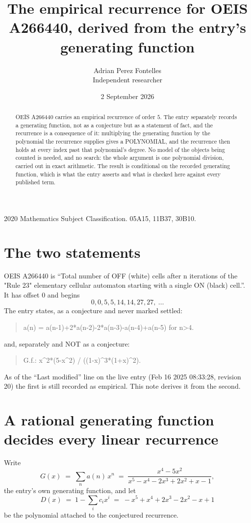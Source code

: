 \documentclass[11pt,a4paper]{article}
\title{The empirical recurrence for OEIS A266440, derived from the entry's generating function}
\author{Adrian Perez Fontelles\\ \small Independent researcher}
\date{2 September 2026}
\theoremstyle{plain}
\theoremstyle{definition}
\begin{document}
\maketitle

\begin{abstract}
OEIS A266440 carries an empirical recurrence of order $5$. The entry separately records a
generating function, not as a conjecture but as a statement of fact, and the recurrence is a
consequence of it: multiplying the generating function by the polynomial the recurrence
supplies gives a POLYNOMIAL, and the recurrence then holds at every index past that
polynomial's degree. No model of the objects being counted is needed, and no search: the
whole argument is one polynomial division, carried out in exact arithmetic. The result is
conditional on the recorded generating function, which is what the entry asserts and what is
checked here against every published term.
\end{abstract}

\noindent\small 2020 Mathematics Subject Classification. 05A15, 11B37, 30B10.\normalsize

\section{The two statements}

OEIS A266440 is ``Total number of OFF (white) cells after n iterations of the "Rule 23" elementary cellular automaton starting with a single ON (black) cell.''. It has offset $0$ and begins
\[
0, 0, 5, 5, 14, 14, 27, 27,\ \dots
\]
The entry states, as a conjecture and never marked settled:
\begin{quote}
a(n) = a(n-1)+2*a(n-2)-2*a(n-3)-a(n-4)+a(n-5) for n>4.
\end{quote}
and, separately and NOT as a conjecture:
\begin{quote}
G.f.: x\^{}2*(5-x\^{}2) / ((1-x)\^{}3*(1+x)\^{}2).
\end{quote}
As of the ``Last modified'' line on the live entry (Feb 16 2025 08:33:28, revision 20) the first is still
recorded as empirical. This note derives it from the second.

\section{A rational generating function decides every linear recurrence}

Write
\[
G(x)\;=\;\sum_{n}a(n)\,x^{n}\;=\;\frac{x^{4} - 5 x^{2}}{x^{5} - x^{4} - 2 x^{3} + 2 x^{2} + x - 1},
\]
the entry's own generating function, and let
\[
D(x)\;=\;1-\sum_i c_i x^{i}\;=\;- x^{5} + x^{4} + 2 x^{3} - 2 x^{2} - x + 1
\]
be the polynomial attached to the conjectured recurrence.
\end{document}
